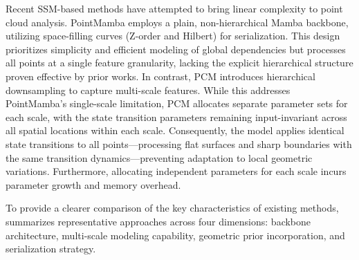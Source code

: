 \documentclass[a4paper,fleqn]{cas-sc}
\begin{document}
Recent SSM-based methods have attempted to bring linear complexity to point
cloud analysis. PointMamba \cite{PointMamba} employs a plain, non-hierarchical
Mamba backbone, utilizing space-filling curves (Z-order and Hilbert) for
serialization. This design prioritizes
simplicity and efficient modeling of global dependencies but processes all points at a single
feature granularity, lacking the explicit hierarchical structure proven
effective by prior works. In contrast, PCM \cite{pcm} introduces hierarchical
downsampling to capture multi-scale features. While this addresses PointMamba's
single-scale limitation, PCM allocates separate parameter sets for each scale,
with the state transition parameters remaining input-invariant across all
spatial locations within each scale. Consequently, the model applies identical
state transitions to all points—processing flat surfaces and sharp boundaries
with the same transition dynamics—preventing adaptation to local geometric
variations. Furthermore, allocating independent parameters for each scale
incurs parameter growth and memory overhead.

To provide a clearer comparison of the key characteristics of existing methods,  summarizes representative approaches across four dimensions: backbone architecture, multi-scale modeling capability, geometric prior incorporation, and serialization strategy.
\end{document}
